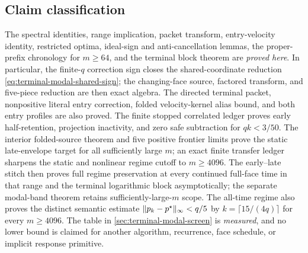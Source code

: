 \subsection*{Claim classification}
The spectral identities, range implication, packet transform, entry-velocity
identity, restricted optima, ideal-sign and anti-cancellation lemmas, the
proper-prefix chronology for $m\ge64$, and the terminal block theorem are
\emph{proved here}.  In particular, the finite-$q$ correction sign closes the
shared-coordinate reduction \eqref{eq:terminal-modal-shared-sign}; the
changing-face source, factored transform, and five-piece reduction are then
exact algebra.  The directed terminal packet, nonpositive literal entry
correction, folded velocity-kernel alias bound, and both entry profiles are
also proved.  The finite stopped correlated ledger proves early
half-retention, projection inactivity, and zero safe subtraction for
$qk<3/50$.  The interior folded-source theorem and five positive frontier
limits prove the static late-envelope target for all sufficiently large $m$;
an exact finite transfer ledger sharpens the static and nonlinear regime
cutoff to $m\ge4096$.  The early--late stitch then proves full regime
preservation at every continued full-face time in that range and the terminal
logarithmic block asymptotically; the separate modal-band theorem retains
sufficiently-large-$m$ scope.  The all-time regime also proves the distinct
semantic estimate $\lVert p_k-p^\star\rVert_\infty<q/5$ by
$k=\lceil15/(4q)\rceil$ for every $m\ge4096$.
The table in \cref{sec:terminal-modal-screen} is \emph{measured}, and no lower
bound is claimed for another algorithm, recurrence, face schedule, or
implicit response primitive.
